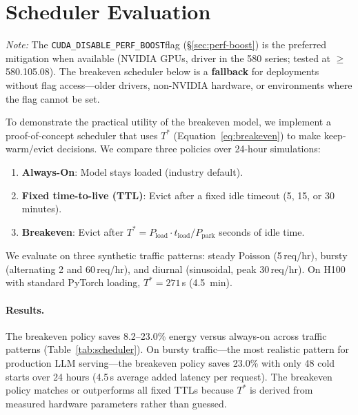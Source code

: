 \documentclass[sigconf,nonacm]{acmart}
\newcommand{\perfboost}{\texttt{CUDA\_\hspace{0pt}DISABLE\_\hspace{0pt}PERF\_\hspace{0pt}BOOST}}
\begin{document}
\section{Scheduler Evaluation}
\label{sec:scheduler}

\emph{Note:} The \perfboost flag (\S\ref{sec:perf-boost}) is the preferred mitigation when available (NVIDIA GPUs, driver in the 580 series; tested at $\geq$580.105.08). The breakeven scheduler below is a \textbf{fallback} for deployments without flag access---older drivers, non-NVIDIA hardware, or environments where the flag cannot be set.

To demonstrate the practical utility of the breakeven model, we implement a proof-of-concept scheduler that uses $T^*$ (Equation~\ref{eq:breakeven}) to make keep-warm/evict decisions. We compare three policies over 24-hour simulations:

\begin{enumerate}
    \item \textbf{Always-On}: Model stays loaded (industry default).
    \item \textbf{Fixed time-to-live (TTL)}: Evict after a fixed idle timeout (5, 15, or 30 minutes).
    \item \textbf{Breakeven}: Evict after $T^* = P_{\text{load}} \cdot t_{\text{load}} / P_{\text{park}}$ seconds of idle time.
\end{enumerate}

We evaluate on three synthetic traffic patterns: steady Poisson (5\,req/hr), bursty (alternating 2 and 60\,req/hr), and diurnal (sinusoidal, peak 30\,req/hr). On H100 with standard PyTorch loading, $T^* = 271$\,s (4.5~min).

\paragraph{Results.} The breakeven policy saves 8.2--23.0\% energy versus always-on across traffic patterns (Table~\ref{tab:scheduler}). On bursty traffic---the most realistic pattern for production LLM serving---the breakeven policy saves 23.0\% with only 48 cold starts over 24 hours (4.5\,s average added latency per request). The breakeven policy matches or outperforms all fixed TTLs because $T^*$ is derived from measured hardware parameters rather than guessed.
\end{document}
